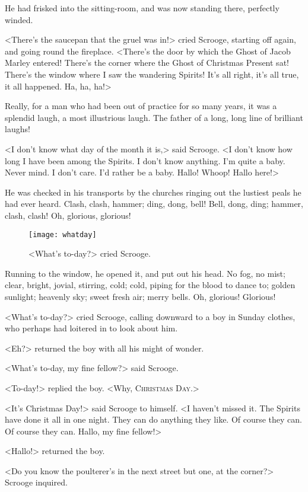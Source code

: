 He had frisked into the sitting-room, and was now standing there, perfectly winded.

<There's the saucepan that the gruel was in!> cried Scrooge, starting off again, and going round the fireplace. <There's the door by which the Ghost of Jacob Marley entered! There's the corner where the Ghost of Christmas Present sat! There's the window where I saw the wandering Spirits! It's all right, it's all true, it all happened. Ha, ha, ha!>

Really, for a man who had been out of practice for so many years, it was a splendid laugh, a most illustrious laugh. The father of a long, long line of brilliant laughs!

<I don't know what day of the month it is,> said Scrooge. <I don't know how long I have been among the Spirits. I don't know anything. I'm quite a baby. Never mind. I don't care. I'd rather be a baby. Hallo! Whoop! Hallo here!>

He was checked in his transports by the churches ringing out the lustiest peals he had ever heard. Clash, clash, hammer; ding, dong, bell! Bell, dong, ding; hammer, clash, clash! Oh, glorious, glorious!

\begin{figure}[tbh]
\centering
\texttt{[image: whatday]}
\caption{<What's to-day?> cried Scrooge.}
\end{figure}


Running to the window, he opened it, and put out his head. No fog, no mist; clear, bright, jovial, stirring, cold; cold, piping for the blood to dance to; golden sunlight; heavenly sky; sweet fresh air; merry bells. Oh, glorious! Glorious!

<What's to-day?> cried Scrooge, calling downward to a boy in Sunday clothes, who perhaps had loitered in to look about him.

<Eh?> returned the boy with all his might of wonder.

<What's to-day, my fine fellow?> said Scrooge.

<To-day!> replied the boy. <Why, \textsc{Christmas Day.}>

<It's Christmas Day!> said Scrooge to himself. <I haven't missed it. The Spirits have done it all in one night. They can do anything they like. Of course they can. Of course they can. Hallo, my fine fellow!>

<Hallo!> returned the boy.

<Do you know the poulterer's in the next street but one, at the corner?> Scrooge inquired.

